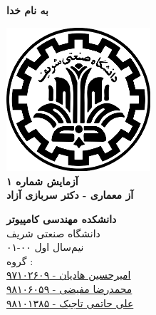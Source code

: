 \documentclass{article}
\begin{document}
\begin{titlepage}
	\begin{center}
		\textbf{ \Huge{به نام خدا}}
	
		\vspace{0.2cm}
		
		\includegraphics[width=0.4\textwidth]{sharif.png}\\
		\vspace{0.2cm}
		\textbf{ \Huge{آزمایش شماره ۱}}\\
		\vspace{0.25cm}
		\textbf{ \Large{آز معماری - دکتر سربازی آزاد}}
		\vspace{0.2cm}
		
		
		\large \textbf{دانشکده مهندسی کامپیوتر}\\\vspace{0.1cm}
		\large   دانشگاه صنعتی شریف\\\vspace{0.2cm}
		\large   ﻧﯿﻢ‌سال اول ۰۰-۰۱ \\\vspace{0.10cm}
		\large{گروه :}\\
		\large{\href{mailto:a.h.hadian@gmail.com}{امیرحسین هادیان - ۹۷۱۰۲۶۰۹}}\\
		\large{\href{mailto:mofayezi.m@gmail.com}{محمدرضا مفیضی - ۹۸۱۰۶۰۵۹}}\\
		\large{\href{mailto:a.hatam008@gmail.com}{علی حاتمی تاجیک - ۹۸۱۰۱۳۸۵}}\\
	\end{center}
\end{titlepage}

\newpage

\pagestyle{fancy}
\fancyhf{}
\fancyfoot{}
\setlength{\headheight}{59pt}
\cfoot{\thepage}
\end{document}
